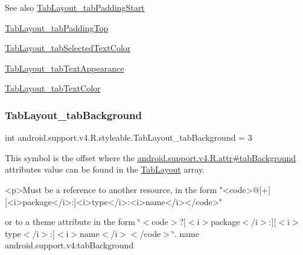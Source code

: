 \begin{DoxySeeAlso}{See also}
\hyperlink{classandroid_1_1support_1_1v4_1_1R_1_1styleable_af995762d21ce21572c50a4d2905ccc22}{Tab\+Layout\+\_\+tab\+Padding\+Start} 

\hyperlink{classandroid_1_1support_1_1v4_1_1R_1_1styleable_a5eb6cfc8bb3bdd5e021b1b208a6e4eca}{Tab\+Layout\+\_\+tab\+Padding\+Top} 

\hyperlink{classandroid_1_1support_1_1v4_1_1R_1_1styleable_a1fc04f3779f703c9f532046d056698cd}{Tab\+Layout\+\_\+tab\+Selected\+Text\+Color} 

\hyperlink{classandroid_1_1support_1_1v4_1_1R_1_1styleable_aeacf242f27f0a2963e574087838a660b}{Tab\+Layout\+\_\+tab\+Text\+Appearance} 

\hyperlink{classandroid_1_1support_1_1v4_1_1R_1_1styleable_a3325892a8a8af0369aea2f77e46cdda0}{Tab\+Layout\+\_\+tab\+Text\+Color} 
\end{DoxySeeAlso}
\mbox{\label{classandroid_1_1support_1_1v4_1_1R_1_1styleable_aff73f001a86e4c7bd3a0406f04e2e608}} 
\subsubsection{\texorpdfstring{Tab\+Layout\+\_\+tab\+Background}{TabLayout\_tabBackground}}
{\footnotesize\ttfamily int android.\+support.\+v4.\+R.\+styleable.\+Tab\+Layout\+\_\+tab\+Background = 3\hspace{0.3cm}{\ttfamily [static]}}

This symbol is the offset where the \hyperlink{classandroid_1_1support_1_1v4_1_1R_1_1attr_aaa4e3120a1afbdbe6b11c73e2c22da5c}{android.\+support.\+v4.\+R.\+attr\#tab\+Background} attribute\textquotesingle{}s value can be found in the \hyperlink{classandroid_1_1support_1_1v4_1_1R_1_1styleable_a48e866d7121b40ef0bb3d467759606a9}{Tab\+Layout} array.

\begin{DoxyVerb}      <p>Must be a reference to another resource, in the form "<code>@[+][<i>package</i>:]<i>type</i>:<i>name</i></code>"
\end{DoxyVerb}
 or to a theme attribute in the form \char`\"{}$<$code$>$?\mbox{[}$<$i$>$package$<$/i$>$\+:\mbox{]}\mbox{[}$<$i$>$type$<$/i$>$\+:\mbox{]}$<$i$>$name$<$/i$>$$<$/code$>$\char`\"{}.  name android.\+support.\+v4\+:tab\+Background \mbox{\label{classandroid_1_1support_1_1v4_1_1R_1_1styleable_a423403a307833c0f1479f98d660ca905}} 
